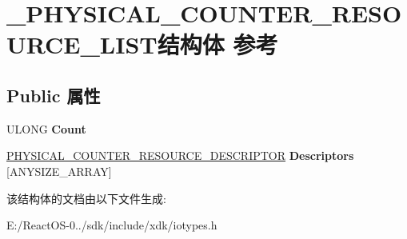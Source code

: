 \hypertarget{struct___p_h_y_s_i_c_a_l___c_o_u_n_t_e_r___r_e_s_o_u_r_c_e___l_i_s_t}{}\section{\+\_\+\+P\+H\+Y\+S\+I\+C\+A\+L\+\_\+\+C\+O\+U\+N\+T\+E\+R\+\_\+\+R\+E\+S\+O\+U\+R\+C\+E\+\_\+\+L\+I\+S\+T结构体 参考}
\label{struct___p_h_y_s_i_c_a_l___c_o_u_n_t_e_r___r_e_s_o_u_r_c_e___l_i_s_t}
\subsection*{Public 属性}
\begin{DoxyCompactItemize}
\item 
\mbox{\label{struct___p_h_y_s_i_c_a_l___c_o_u_n_t_e_r___r_e_s_o_u_r_c_e___l_i_s_t_a2e92e56225b97ff8a17b021700cd7219}} 
U\+L\+O\+NG {\bfseries Count}
\item 
\mbox{\label{struct___p_h_y_s_i_c_a_l___c_o_u_n_t_e_r___r_e_s_o_u_r_c_e___l_i_s_t_a0dff0fe0187fdd577412247c66845c91}} 
\hyperlink{struct___p_h_y_s_i_c_a_l___c_o_u_n_t_e_r___r_e_s_o_u_r_c_e___d_e_s_c_r_i_p_t_o_r}{P\+H\+Y\+S\+I\+C\+A\+L\+\_\+\+C\+O\+U\+N\+T\+E\+R\+\_\+\+R\+E\+S\+O\+U\+R\+C\+E\+\_\+\+D\+E\+S\+C\+R\+I\+P\+T\+OR} {\bfseries Descriptors} \mbox{[}A\+N\+Y\+S\+I\+Z\+E\+\_\+\+A\+R\+R\+AY\mbox{]}
\end{DoxyCompactItemize}


该结构体的文档由以下文件生成\+:\begin{DoxyCompactItemize}
\item 
E\+:/\+React\+O\+S-\/0../sdk/include/xdk/iotypes.\+h\end{DoxyCompactItemize}
